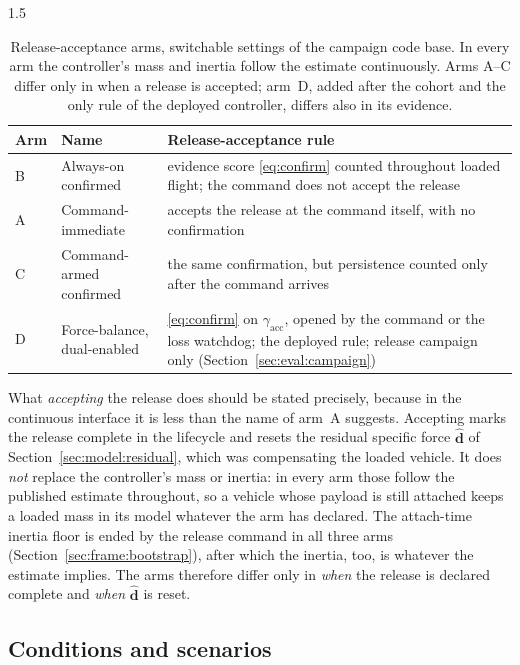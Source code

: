 \begin{spacing}{1.5}
\begin{table}[ht]
\centering
\caption[Release-acceptance arms]{Release-acceptance arms, switchable settings
of the campaign code base. In every arm the controller's mass and inertia follow
the estimate continuously. Arms A--C differ only in when a release is accepted; arm~D, added after the cohort and the only rule of the
deployed controller, differs also in its evidence.}
\label{tab:arms}
\small
\begin{tabularx}{\textwidth}{@{}l l X@{}}
\toprule
\textbf{Arm} & \textbf{Name} & \textbf{Release-acceptance rule} \\
\midrule
B & Always-on confirmed & evidence score \eqref{eq:confirm} counted throughout loaded flight; the command does not accept the release \\
A & Command-immediate & accepts the release at the command itself, with no confirmation \\
C & Command-armed confirmed & the same confirmation, but persistence counted only after the command arrives \\
\midrule
D & Force-balance, dual-enabled & \eqref{eq:confirm} on $\gamma_{\mathrm{acc}}$, opened by the command or the loss watchdog; the deployed rule; release campaign only (Section~\ref{sec:eval:campaign}) \\
\bottomrule
\end{tabularx}
\end{table}

What \emph{accepting} the release does should be stated precisely, because in
the continuous interface it is less than the name of arm~A suggests. Accepting
marks the release complete in the lifecycle and resets the residual specific
force $\hat{\bm d}$ of Section~\ref{sec:model:residual}, which was compensating
the loaded vehicle. It does \emph{not} replace the controller's mass or
inertia: in every arm those follow the published estimate throughout, so a
vehicle whose payload is still attached keeps a loaded mass in its model
whatever the arm has declared. The attach-time inertia floor is ended by the
release command in all three arms (Section~\ref{sec:frame:bootstrap}), after
which the inertia, too, is whatever the estimate implies. The arms therefore
differ only in \emph{when} the release is declared complete and \emph{when}
$\hat{\bm d}$ is reset.

\subsection{Conditions and scenarios}\label{sec:eval:conditions}


\end{spacing}
